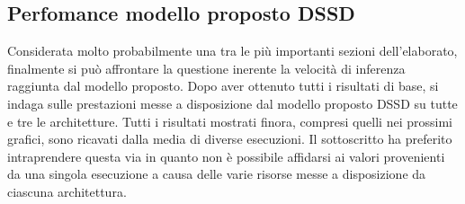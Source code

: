\subsection{Perfomance modello proposto DSSD}
Considerata molto probabilmente una tra le più importanti sezioni dell'elaborato, 
finalmente si può affrontare la questione inerente la velocità 
di inferenza raggiunta dal modello proposto. Dopo aver ottenuto tutti i 
risultati di base, si indaga sulle prestazioni messe a disposizione dal modello 
proposto DSSD su tutte e tre le architetture. Tutti i risultati mostrati finora, 
compresi quelli nei prossimi grafici, sono ricavati dalla media di diverse 
esecuzioni. Il sottoscritto ha preferito intraprendere questa via in quanto 
non è possibile affidarsi ai valori provenienti da una singola esecuzione a 
causa delle varie risorse messe a disposizione da ciascuna architettura. 

